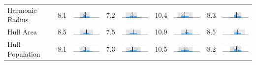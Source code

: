 \begin{table}
\begin{tabular}{l rm{7em} rm{7em} rm{7em} rm{7em}}
Harmonic Radius        &   8.1 &  \includegraphics[width=7em]{mini_hist/PA_2000_harm_radius} &   7.2 &  \includegraphics[width=7em]{mini_hist/PA_2004_harm_radius} &  10.4 &  \includegraphics[width=7em]{mini_hist/PA_2008_harm_radius} &   8.3 &  \includegraphics[width=7em]{mini_hist/PA_2012_harm_radius} \\
Hull Area              &   8.5 &       \includegraphics[width=7em]{mini_hist/PA_2000_hull_a} &   7.5 &       \includegraphics[width=7em]{mini_hist/PA_2004_hull_a} &  10.9 &       \includegraphics[width=7em]{mini_hist/PA_2008_hull_a} &   8.5 &       \includegraphics[width=7em]{mini_hist/PA_2012_hull_a} \\
Hull Population        &   8.1 &       \includegraphics[width=7em]{mini_hist/PA_2000_hull_p} &   7.3 &       \includegraphics[width=7em]{mini_hist/PA_2004_hull_p} &  10.5 &       \includegraphics[width=7em]{mini_hist/PA_2008_hull_p} &   8.2 &       \includegraphics[width=7em]{mini_hist/PA_2012_hull_p} \\

\end{tabular}
\end{table}
